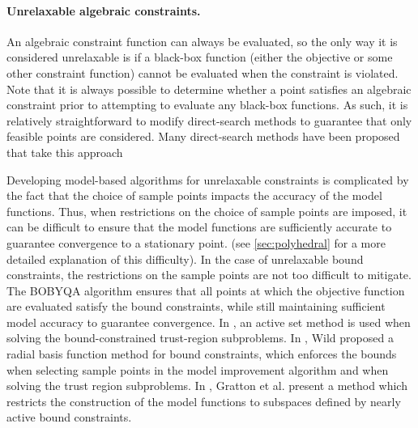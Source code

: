 \documentclass{article}
\begin{document}
\paragraph*{Unrelaxable algebraic constraints.}  

 An algebraic constraint function can always be evaluated, so the only way it is considered unrelaxable is if a black-box function (either the objective or some other constraint function) cannot be evaluated when the constraint is violated.
Note that it is always possible to determine whether a point satisfies an algebraic constraint prior to attempting to evaluate any black-box functions.  As such, it is relatively straightforward to modify direct-search methods to guarantee that only feasible points are considered.     
Many direct-search methods have been proposed that take this approach
\cite{box:new, spendley.hext.ea:sequential,may:linearly,may:solving,lewis.torczon:globally,lewis.torczon:direct,
vandenberghen:condor, lewis.torczon:pattern2000,lucidi.sciandrone:derivative-free,chandramouli.narayanan:scaled,kolda.lewis.ea:stationarity,lucidi.sciandrone.ea:objective, 
audet.ledigabel.ea:linear,gratton.royer.ea:direct2019,gratton.royer.ea:direct2015}
%
  
Developing model-based algorithms for unrelaxable constraints is complicated by the fact that the choice of sample points impacts the accuracy of the model functions.     Thus, when restrictions on the choice of sample points are imposed,  it can be difficult to ensure that the model functions are sufficiently accurate to guarantee convergence to a stationary point.    (see \cref{sec:polyhedral} for a more detailed explanation of this difficulty).   In the case of unrelaxable bound constraints, the restrictions on the sample points are not too difficult to mitigate.     The BOBYQA algorithm \cite{powell:BOBYQA} ensures that all points at which the objective function are evaluated satisfy the bound constraints, while still maintaining sufficient model accuracy to guarantee convergence.    In \cite{arouxet.echebest.ea:active-set},  an active set method is used when solving the bound-constrained trust-region subproblems.    In \cite{wild:derivative-free}, Wild proposed a radial basis function method for bound constraints, which enforces the bounds when selecting sample points in the model improvement algorithm and when solving the trust region subproblems.   In \cite{gratton.toint.ea:active-set}, Gratton et al. present a method which restricts the construction of the model functions to subspaces defined by nearly active bound constraints.
\end{document}
